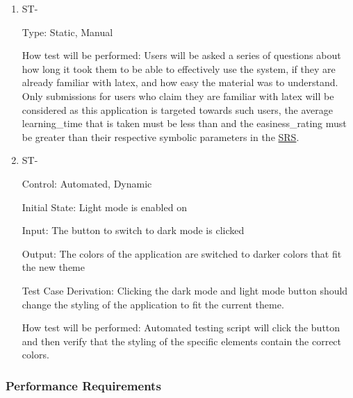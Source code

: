 \documentclass[12pt, titlepage]{article}
\newcounter{TESTID}
\newcommand\TESTNUM{\stepcounter{TESTID}\theTESTID}
\begin{document}
	\begin{enumerate}
		
		\item{ST-\TESTNUM\\}
		
		Type: Static, Manual
		
		How test will be performed: Users will be asked a series of questions about how long it took them to be able to effectively use the system, if they are already familiar with latex, and how easy the material was to understand. Only submissions for users who claim they are familiar with latex will be considered as this application is targeted towards such users, the average learning\_time that is taken must be less than and the easiness\_rating must be greater than their respective symbolic parameters in the \href{https://github.com/RutheniumVI/UnderTree/blob/main/docs/SRS/SRS.pdf}{SRS}.
		
		\item{ST-\TESTNUM\\}
		
		Control: Automated, Dynamic
		
		Initial State: Light mode is enabled on 
		
		Input: The button to switch to dark mode is clicked
		
		Output: The colors of the application are switched to darker colors that fit the new theme
		
		Test Case Derivation: Clicking the dark mode and light mode button should change the styling of the application to fit the current theme.
		
		How test will be performed: Automated testing script will click the button and then verify that the styling of the specific elements contain the correct colors.
		
	\end{enumerate}
	
	\subsubsection{Performance Requirements}
	
\end{document}
